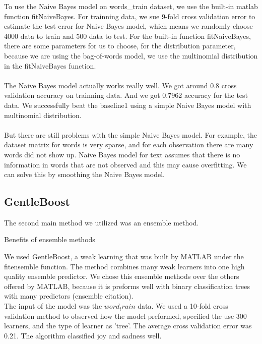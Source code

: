 \documentclass[]{article}
\begin{document}
To use the Naive Bayes model on words\_train dataset, we use the built-in matlab function fitNaiveBayes. For trainning data, we sue 9-fold cross validation error to estimate the test error for Naive Bayes model, which means we randomly choose 4000 data to train and 500 data to test. For the built-in function fitNaiveBayes, there are some parameters for us to choose, for the distribution parameter, because we are using the bag-of-words model, we use the multinomial distribution in the fitNaiveBayes function. \\\\

The Naive Bayes model actually works really well. We got around 0.8 cross validation accuracy on trainning data. And we got 0.7962 accuracy for the test data. We successfully beat the baseline1 using a simple Naive Bayes model with multinomial distribution. \\\\

But there are still problems with the simple Naive Bayes model. For example, the dataset matrix for words is very sparse, and for each observation there are many  words did not show up. Naive Bayes model for text assumes that there is no information in words that are not observed and this may cause overfitting. We can solve this by smoothing the Naive Bayes model.

\subsection{GentleBoost}

The second main method we utilized was an ensemble method. 

Benefits of ensemble methods 



We used GentleBoost, a weak learning that was built by MATLAB under the fitensemble function. The method combines many weak learners into one high quality ensemble predictor. We chose this ensemble methods over the others offered by MATLAB, because it is preforms well with binary classification trees with many predictors (ensemble citation). \\

The input of the model was the $word_train$ data. We used a 10-fold cross validation method to observed how the model preformed, specified the use 300 learners, and the type of learner as 'tree'. The average cross validation error was 0.21. The algorithm classified joy and sadness well. \\
\end{document}
